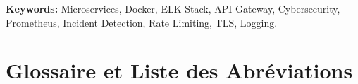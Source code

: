 \documentclass[12pt, a4paper]{report}
\begin{document}
\medskip
\noindent\textbf{Keywords:} Microservices, Docker, ELK Stack, API Gateway, Cybersecurity, Prometheus, Incident Detection, Rate Limiting, TLS, Logging.

\clearpage

\tableofcontents
\clearpage

\listoffigures
\clearpage

\listoftables
\clearpage

\chapter*{Glossaire et Liste des Abréviations}
\end{document}
